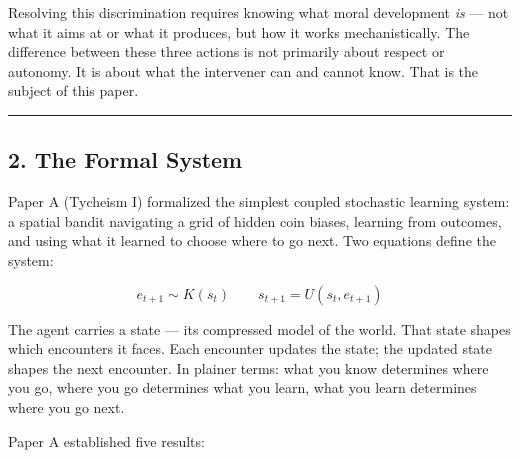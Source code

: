 \documentclass[
]{article}
\begin{document}
Resolving this discrimination requires knowing what moral development
\emph{is} --- not what it aims at or what it produces, but how it works
mechanistically. The difference between these three actions is not
primarily about respect or autonomy. It is about what the intervener can
and cannot know. That is the subject of this paper.

\begin{center}\rule{0.5\linewidth}{0.5pt}\end{center}

\subsection{2. The Formal System}\label{the-formal-system}

Paper A (Tycheism I) formalized the simplest coupled stochastic learning
system: a spatial bandit navigating a grid of hidden coin biases,
learning from outcomes, and using what it learned to choose where to go
next. Two equations define the system:

\[e_{t+1} \sim K(s_t) \qquad s_{t+1} = U(s_t, e_{t+1})\]

The agent carries a state --- its compressed model of the world. That
state shapes which encounters it faces. Each encounter updates the
state; the updated state shapes the next encounter. In plainer terms:
what you know determines where you go, where you go determines what you
learn, what you learn determines where you go next.

Paper A established five results:
\end{document}
